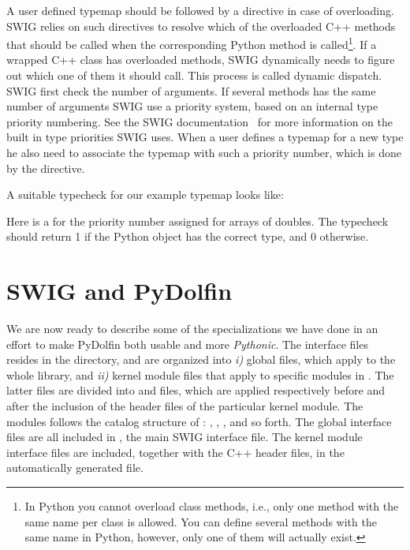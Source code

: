 A user defined typemap should be followed by a  directive
in case of overloading. SWIG relies on such directives to resolve which of the overloaded C++ methods that should be
called when the corresponding Python method is called\footnote{In Python you cannot overload class methods, i.e., only one method with the same name per class is allowed. You can define several methods with the same name in Python, however, only one of them will actually exist.}. If a wrapped C++ class has overloaded methods, SWIG dynamically needs to figure out which one of them it should call. This process is called dynamic dispatch. SWIG first check the number of arguments. If several methods has the same number of arguments SWIG use a priority system, based on an internal type priority numbering. See the SWIG documentation~\cite{www:swig} for more information on the built in type priorities SWIG uses. When a user defines a typemap for a new type he also need to associate the typemap with such a priority number, which is done by the  directive.\par
A suitable typecheck for our example typemap looks like:
Here  is a  for the priority number assigned for arrays of doubles. The typecheck should return 1 if the Python object  has the correct type, and 0 otherwise.\par

\section{SWIG and PyDolfin}
We are now ready to describe some of the specializations we have done in an effort to make PyDolfin both usable and more \textit{Pythonic}. The interface files resides in the  directory, and are organized into \textit{i)} global files, which apply to the whole \dolfin library, and \textit{ii)} kernel module files that apply to specific modules in \dolfin. The latter files are divided into  and  files, which are applied respectively before and after the inclusion of the header files of the particular kernel module. The modules follows the catalog structure of \dolfin: , , ,  and so forth. The global interface files are all included in , the main SWIG interface file. The kernel module interface files are included, together with the C++ header files, in the automatically generated  file.\par

